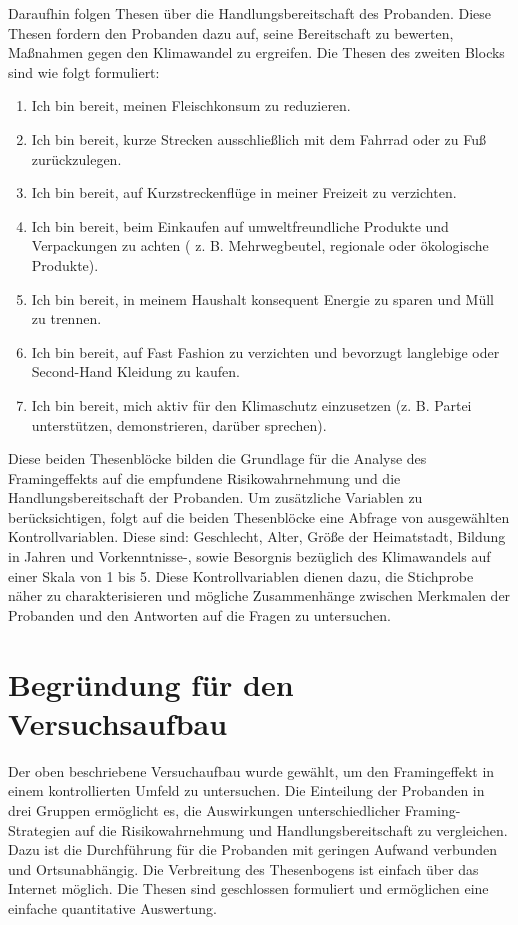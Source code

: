 \documentclass[12pt,twoside=off,
bibtotoc,liststotoc,appendixprefix,paper=a4,headings=small]{scrbook} %
\begin{document}
Daraufhin folgen Thesen über die Handlungsbereitschaft des Probanden. Diese Thesen fordern den Probanden dazu auf, seine Bereitschaft zu bewerten, Maßnahmen gegen den Klimawandel zu ergreifen. Die Thesen des zweiten Blocks sind wie folgt formuliert:
\begin{enumerate}
  \item Ich bin bereit, meinen Fleischkonsum zu reduzieren.
  \item Ich bin bereit, kurze Strecken ausschließlich mit dem Fahrrad oder zu Fuß zurückzulegen.
  \item Ich bin bereit, auf Kurzstreckenflüge in meiner Freizeit zu verzichten.
  \item Ich bin bereit, beim Einkaufen auf umweltfreundliche Produkte und Verpackungen zu achten ( z. B. Mehrwegbeutel, regionale oder ökologische Produkte).
  \item Ich bin bereit, in meinem Haushalt konsequent Energie zu sparen und Müll zu trennen.
  \item Ich bin bereit, auf Fast Fashion zu verzichten und bevorzugt langlebige oder Second-Hand Kleidung zu kaufen.
  \item Ich bin bereit, mich aktiv für den Klimaschutz einzusetzen (z. B. Partei unterstützen, demonstrieren, darüber sprechen).
\end{enumerate}

Diese beiden Thesenblöcke bilden die Grundlage für die Analyse des Framingeffekts auf die empfundene Risikowahrnehmung und die Handlungsbereitschaft der Probanden. Um zusätzliche Variablen zu berücksichtigen, folgt auf die beiden Thesenblöcke eine Abfrage von ausgewählten Kontrollvariablen. Diese sind: Geschlecht, Alter, Größe der Heimatstadt, Bildung in Jahren und Vorkenntnisse-, sowie Besorgnis bezüglich des Klimawandels auf einer Skala von 1 bis 5.
Diese Kontrollvariablen dienen dazu, die Stichprobe näher zu charakterisieren und mögliche Zusammenhänge zwischen Merkmalen der Probanden und den Antworten auf die Fragen zu untersuchen.

\section{Begründung für den Versuchsaufbau}
Der oben beschriebene Versuchaufbau wurde gewählt, um den Framingeffekt in einem kontrollierten Umfeld zu untersuchen. Die Einteilung der Probanden in drei Gruppen ermöglicht es, die Auswirkungen unterschiedlicher Framing-Strategien auf die Risikowahrnehmung und Handlungsbereitschaft zu vergleichen. Dazu ist die Durchführung für die Probanden mit geringen Aufwand verbunden und Ortsunabhängig. Die Verbreitung des Thesenbogens ist einfach über das Internet möglich. Die Thesen sind geschlossen formuliert und ermöglichen eine einfache quantitative Auswertung.
\end{document}
